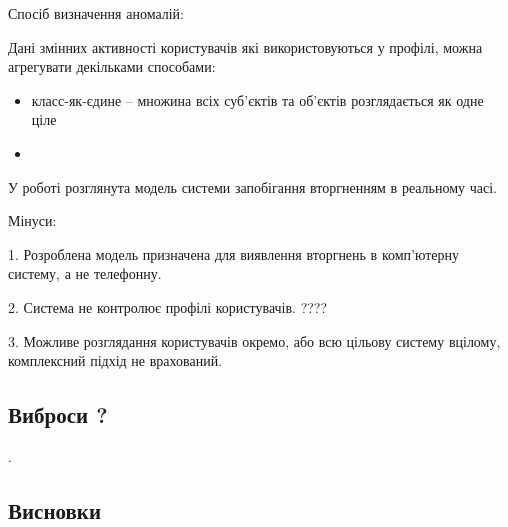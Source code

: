 Спосіб визначення аномалій:

    Дані змінних активності користувачів які використовуються у профілі, можна агрегувати декільками способами: %

\begin{itemize}
  \item класс-як-єдине -- множина всіх суб'єктів та об'єктів розглядається як одне ціле
  \item \TBD
\end{itemize}

    У роботі  розглянута модель системи запобігання вторгненням в реальному часі.

	Мінуси:

	1. Розроблена модель призначена для виявлення вторгнень в комп'ютерну систему, а не телефонну.

	2. Система не контролює профілі користувачів. ???? %

	3. Можливе розглядання користувачів окремо, або всю цільову систему вцілому, комплексний підхід не врахований. \TBD

\subsection{Виброси ? \TBD}
    \TBD \cite{ben2005outlier}.


\newpage
\subsection*{Висновки}
    \TBD
